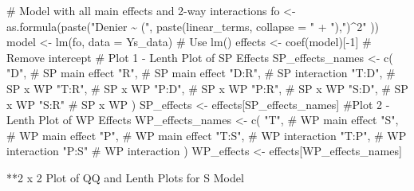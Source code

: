 \documentclass[
  letterpaper,
  DIV=11,
  numbers=noendperiod]{scrartcl}
\newenvironment{Shaded}{\begin{snugshade}}{\end{snugshade}}
\newcommand{\AttributeTok}[1]{\textcolor[rgb]{0.40,0.45,0.13}{#1}}
\newcommand{\CommentTok}[1]{\textcolor[rgb]{0.37,0.37,0.37}{#1}}
\newcommand{\DecValTok}[1]{\textcolor[rgb]{0.68,0.00,0.00}{#1}}
\newcommand{\FunctionTok}[1]{\textcolor[rgb]{0.28,0.35,0.67}{#1}}
\newcommand{\NormalTok}[1]{\textcolor[rgb]{0.00,0.23,0.31}{#1}}
\newcommand{\OtherTok}[1]{\textcolor[rgb]{0.00,0.23,0.31}{#1}}
\newcommand{\SpecialCharTok}[1]{\textcolor[rgb]{0.37,0.37,0.37}{#1}}
\newcommand{\StringTok}[1]{\textcolor[rgb]{0.13,0.47,0.30}{#1}}
\begin{document}
\begin{Shaded}
\begin{Highlighting}[]
\CommentTok{\# Model with all main effects and 2{-}way interactions}
\NormalTok{fo }\OtherTok{\textless{}{-}} \FunctionTok{as.formula}\NormalTok{(}\FunctionTok{paste}\NormalTok{(}\StringTok{"Denier \textasciitilde{} ("}\NormalTok{, }
    \FunctionTok{paste}\NormalTok{(linear\_terms, }\AttributeTok{collapse =} \StringTok{" + "}\NormalTok{),}\StringTok{")\^{}2"}
\NormalTok{  ))}
\NormalTok{model }\OtherTok{\textless{}{-}} \FunctionTok{lm}\NormalTok{(fo, }\AttributeTok{data =}\NormalTok{ Ys\_data)  }\CommentTok{\# Use lm()}
\NormalTok{effects }\OtherTok{\textless{}{-}} \FunctionTok{coef}\NormalTok{(model)[}\SpecialCharTok{{-}}\DecValTok{1}\NormalTok{]    }\CommentTok{\# Remove intercept}
\CommentTok{\# Plot 1 {-} Lenth Plot of SP Effects}
\NormalTok{SP\_effects\_names }\OtherTok{\textless{}{-}} \FunctionTok{c}\NormalTok{(}
  \StringTok{"D"}\NormalTok{,    }\CommentTok{\# SP main effect}
  \StringTok{"R"}\NormalTok{,    }\CommentTok{\# SP main effect}
  \StringTok{"D:R"}\NormalTok{,  }\CommentTok{\# SP interaction}
  \StringTok{"T:D"}\NormalTok{,  }\CommentTok{\# SP x WP}
  \StringTok{"T:R"}\NormalTok{,  }\CommentTok{\# SP x WP}
  \StringTok{"P:D"}\NormalTok{,  }\CommentTok{\# SP x WP}
  \StringTok{"P:R"}\NormalTok{,  }\CommentTok{\# SP x WP}
  \StringTok{"S:D"}\NormalTok{,  }\CommentTok{\# SP x WP}
  \StringTok{"S:R"}   \CommentTok{\# SP x WP}
\NormalTok{)}
\NormalTok{SP\_effects }\OtherTok{\textless{}{-}}\NormalTok{ effects[SP\_effects\_names]}
\CommentTok{\#Plot 2 {-} Lenth Plot of WP Effects}
\NormalTok{WP\_effects\_names }\OtherTok{\textless{}{-}} \FunctionTok{c}\NormalTok{(}
  \StringTok{"T"}\NormalTok{,    }\CommentTok{\# WP main effect}
  \StringTok{"S"}\NormalTok{,    }\CommentTok{\# WP main effect}
  \StringTok{"P"}\NormalTok{,    }\CommentTok{\# WP main effect}
  \StringTok{"T:S"}\NormalTok{,  }\CommentTok{\# WP interaction}
  \StringTok{"T:P"}\NormalTok{,  }\CommentTok{\# WP interaction}
  \StringTok{"P:S"}   \CommentTok{\# WP interaction}
\NormalTok{)}
\NormalTok{WP\_effects }\OtherTok{\textless{}{-}}\NormalTok{ effects[WP\_effects\_names]}
\end{Highlighting}
\end{Shaded}

**2 x 2 Plot of QQ and Lenth Plots for S Model
\end{document}
